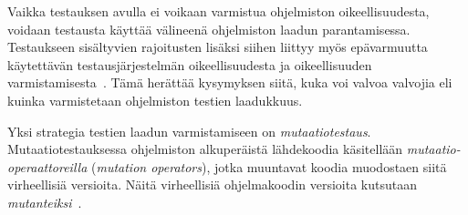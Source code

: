 \documentclass[finnish, grading]{tktltiki2}
\theoremstyle{definition}
\theoremstyle{remark}
\begin{document}
%
%
%

Vaikka testauksen avulla ei voikaan varmistua ohjelmiston oikeellisuudesta, voidaan testausta käyttää välineenä ohjelmiston laadun parantamisessa. Testaukseen sisältyvien rajoitusten lisäksi siihen liittyy myös epävarmuutta käytettävän testausjärjestelmän oikeellisuudesta ja oikeellisuuden varmistamisesta~\cite[s. 209]{Manna:Waldinger:1978}. Tämä herättää kysymyksen siitä, kuka voi valvoa valvojia eli kuinka varmistetaan ohjelmiston testien laadukkuus.

Yksi strategia testien laadun varmistamiseen on \textit{mutaatiotestaus}. Mutaatiotestauksessa ohjelmiston alkuperäistä lähdekoodia käsitellään \textit{mutaatio-operaattoreilla} (\textit{mutation operators}), jotka muuntavat koodia muodostaen siitä virheellisiä versioita. Näitä virheellisiä ohjelmakoodin versioita kutsutaan \textit{mutanteiksi}~\cite[s. 869]{Ma:Harrold:Kwon:2006}. 
\end{document}
